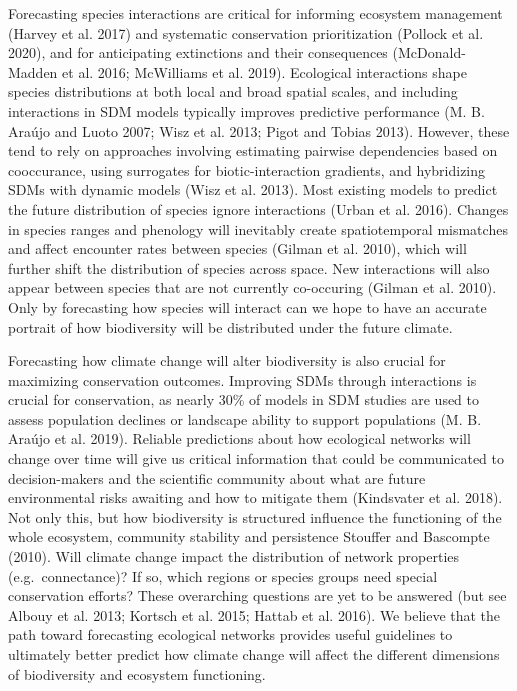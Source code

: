 \documentclass[10pt,oneside]{article}
\begin{document}
Forecasting species interactions are critical for informing ecosystem
management (Harvey et al. 2017) and systematic conservation
prioritization (Pollock et al. 2020), and for anticipating extinctions
and their consequences (McDonald-Madden et al. 2016; McWilliams et al.
2019). Ecological interactions shape species distributions at both local
and broad spatial scales, and including interactions in SDM models
typically improves predictive performance (M. B. Araújo and Luoto 2007;
Wisz et al. 2013; Pigot and Tobias 2013). However, these tend to rely on
approaches involving estimating pairwise dependencies based on
cooccurance, using surrogates for biotic-interaction gradients, and
hybridizing SDMs with dynamic models (Wisz et al. 2013). Most existing
models to predict the future distribution of species ignore interactions
(Urban et al. 2016). Changes in species ranges and phenology will
inevitably create spatiotemporal mismatches and affect encounter rates
between species (Gilman et al. 2010), which will further shift the
distribution of species across space. New interactions will also appear
between species that are not currently co-occuring (Gilman et al. 2010).
Only by forecasting how species will interact can we hope to have an
accurate portrait of how biodiversity will be distributed under the
future climate.

Forecasting how climate change will alter biodiversity is also crucial
for maximizing conservation outcomes. Improving SDMs through
interactions is crucial for conservation, as nearly 30\% of models in
SDM studies are used to assess population declines or landscape ability
to support populations (M. B. Araújo et al. 2019). Reliable predictions
about how ecological networks will change over time will give us
critical information that could be communicated to decision-makers and
the scientific community about what are future environmental risks
awaiting and how to mitigate them (Kindsvater et al. 2018). Not only
this, but how biodiversity is structured influence the functioning of
the whole ecosystem, community stability and persistence Stouffer and
Bascompte (2010). Will climate change impact the distribution of network
properties (e.g.~connectance)? If so, which regions or species groups
need special conservation efforts? These overarching questions are yet
to be answered (but see Albouy et al. 2013; Kortsch et al. 2015; Hattab
et al. 2016). We believe that the path toward forecasting ecological
networks provides useful guidelines to ultimately better predict how
climate change will affect the different dimensions of biodiversity and
ecosystem functioning.
\end{document}

